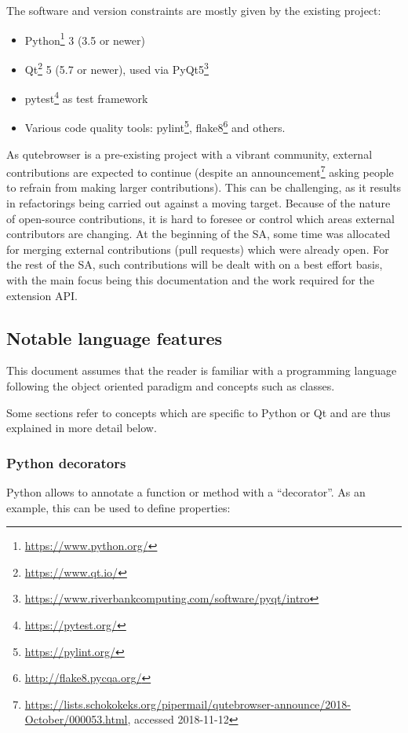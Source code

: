 The software and version constraints are mostly given by the existing project:

\begin{itemize}[parsep=5pt]
  \item Python\footnote{\url{https://www.python.org/}} 3 (3.5 or newer)
  \item Qt\footnote{\url{https://www.qt.io/}} 5 (5.7 or newer), used via PyQt5\footnote{\url{https://www.riverbankcomputing.com/software/pyqt/intro}}
  \item pytest\footnote{\url{https://pytest.org/}} as test framework
  \item Various code quality tools: pylint\footnote{\url{https://pylint.org/}},
    flake8\footnote{\url{http://flake8.pycqa.org/}} and others.
\end{itemize}

As qutebrowser is a pre-existing project with a vibrant community, external
contributions are expected to continue (despite an
announcement\footnote{\url{https://lists.schokokeks.org/pipermail/qutebrowser-announce/2018-October/000053.html}, accessed 2018-11-12}
asking people to refrain from making larger contributions). This can be challenging,
as it results in refactorings being carried out against a moving target. Because
of the nature of open-source contributions,
it is hard to foresee or control which areas external contributors are changing.
At the beginning of the SA, some time was allocated for merging external
contributions (pull requests) which were already open. For the rest of the SA,
such contributions will be dealt with on a best effort basis, with the main
focus being this documentation and the work required for the extension API.

\subsection{Notable language features}
\label{sec:langfeatures}
This document assumes that the reader is familiar with a programming language
following the object oriented paradigm and concepts such as classes.

Some sections refer to concepts which are specific to Python or Qt and are
thus explained in more detail below.

\subsubsection{Python decorators}
Python allows to annotate a function or method with a ``decorator''. As an
example, this can be used to define properties:

